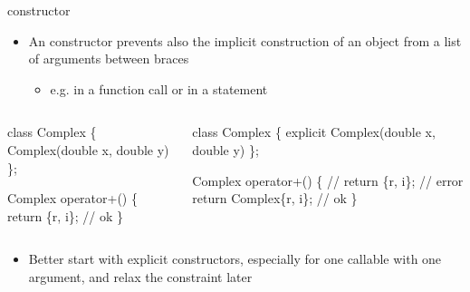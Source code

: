 \begin{frame}[fragile]{ constructor \insertcontinuationtext}

  \begin{itemize}
  \item An  constructor prevents also the implicit construction
    of an object from a list of arguments between braces
    \begin{itemize}
    \item e.g. in a function call or in a  statement
    \end{itemize}
  \end{itemize}

  \begin{columns}[t]
    \begin{column}{.45\textwidth}
      \begin{codeblock}
class Complex \{
  Complex(double x, double y) \ddd
  \ddd
\};

Complex operator+(\ddd)
\{
  \ddd
  return \{r, i\}; // ok
\}\end{codeblock}

    \end{column}

    \begin{column}{.55\textwidth}
      \begin{codeblock}
class Complex \{
  \alert{explicit} Complex(double x, double y) \ddd
  \ddd
\};

Complex operator+(\ddd)
\{
  \ddd
  // return \{r, i\}; // error
  return Complex\{r, i\}; // ok
\}\end{codeblock}

    \end{column}

  \end{columns}

  \begin{itemize}
  \item<2> Better start with explicit constructors, especially for one callable
    with one argument, and relax the constraint later
  \end{itemize}

\end{frame}

